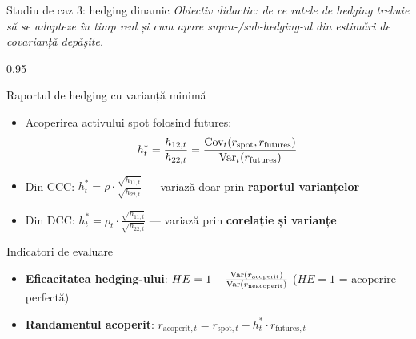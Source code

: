 \documentclass[9pt, aspectratio=169, t]{beamer}
\begin{document}
\begin{frame}{Studiu de caz 3: hedging dinamic}
    \vspace{-2mm}
    {\scriptsize\textit{Obiectiv didactic: de ce ratele de hedging trebuie să se adapteze în timp real și cum apare supra-/sub-hedging-ul din estimări de covarianță depășite.}}\vspace{1mm}
    \begin{cminipage}{0.95\textwidth}
    {\footnotesize
    \begin{block}{Raportul de hedging cu varianță minimă}
        \begin{itemize}\setlength{\itemsep}{0pt}
            \item Acoperirea activului spot folosind futures:
            \[
                h_t^* = \frac{h_{12,t}}{h_{22,t}} = \frac{\text{Cov}_t(r_{\text{spot}}, r_{\text{futures}})}{\text{Var}_t(r_{\text{futures}})}
            \]
            \item Din CCC: $h_t^* = \rho \cdot \frac{\sqrt{h_{11,t}}}{\sqrt{h_{22,t}}}$ --- variază doar prin \textbf{raportul varianțelor}
            \item Din DCC: $h_t^* = \rho_t \cdot \frac{\sqrt{h_{11,t}}}{\sqrt{h_{22,t}}}$ --- variază prin \textbf{corelație și varianțe}
        \end{itemize}
    \end{block}
    \begin{block}{Indicatori de evaluare}
        \begin{itemize}\setlength{\itemsep}{0pt}
            \item \textbf{Eficacitatea hedging-ului}: $HE = 1 - \frac{\text{Var}(r_{\text{acoperit}})}{\text{Var}(r_{\text{neacoperit}})}$ \quad ($HE = 1$ = acoperire perfectă)
            \item \textbf{Randamentul acoperit}: $r_{\text{acoperit},t} = r_{\text{spot},t} - h_t^* \cdot r_{\text{futures},t}$
        \end{itemize}
    \end{block}
    }
    \end{cminipage}
\end{frame}
\end{document}
